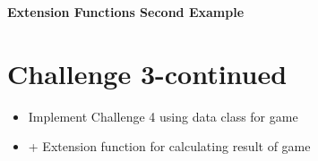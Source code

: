     \begin{frame}[c]
        \slidehead
        \centering
        \large
        \textbf{Extension Functions Second Example}
        \vspace{1em}
        \normalsize
    \end{frame}

    \section{Challenge 3-continued}\label{sec:challenge-3-cont}
    \begin{frame}[c, fragile]
        \slidehead
        \begin{itemize}[<+->]
            \item Implement Challenge 4 using data class for game
            \item + Extension function for calculating result of game
        \end{itemize}

    \end{frame}

